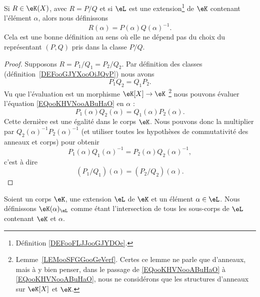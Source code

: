 \begin{lemmaDef}        \label{DEFooZHBZooKlNfGZ}
    Si \( R\in \eK(X)\), avec \( R=P/Q\) et si \( \eL\) est une extension\footnote{Définition \ref{DEFooFLJJooGJYDOe}.} de \( \eK\) contenant l'élément \( \alpha\), alors nous définissons
    \begin{equation}
        R(\alpha)=P(\alpha)Q(\alpha)^{-1}.
    \end{equation}
    Cela est une bonne définition au sens où elle ne dépend pas du choix du représentant \( (P,Q)\) pris dans la classe \( P/Q\).
\end{lemmaDef}

\begin{proof}
    Supposons \( R=P_1/Q_1=P_2/Q_2\). Par définition des classes (définition~\ref{DEFooGJYXooOiJQvP}) nous avons
    \begin{equation}        \label{EQooKHVNooABuHaO}
        P_1Q_2=Q_1P_2.
    \end{equation}
    Vu que l'évaluation est un morphisme \( \eK[X]\to\eK\) \footnote{Lemme~\ref{LEMooSFGGooGeVerf}. Certes ce lemme ne parle que d'anneaux, mais à y bien penser, dans le passage de \eqref{EQooKHVNooABuHaO} à \eqref{EQooKHVNooABuHaO}, nous ne considérons que les structures d'anneaux sur \( \eK[X]\) et \( \eK\).} nous pouvons évaluer l'équation \eqref{EQooKHVNooABuHaO} en \( \alpha\) :
    \begin{equation}        \label{EQooJAIGooRADgiD}
        P_1(\alpha)Q_2(\alpha)=Q_1(\alpha)P_2(\alpha).
    \end{equation}
    Cette dernière est une égalité dans le corps \( \eK\). Nous pouvons donc la multiplier par \( Q_2(\alpha)^{-1}P_2(\alpha)^{-1}\) (et utiliser toutes les hypothèses de commutativité des anneaux et corps) pour obtenir
    \begin{equation}
        P_1(\alpha)Q_1(\alpha)^{-1}=P_2(\alpha)Q_2(\alpha)^{-1},
    \end{equation}
    c'est à dire
    \begin{equation}
        (P_1/Q_1)(\alpha)=(P_2/Q_2)(\alpha).
    \end{equation}
\end{proof}

\begin{definition}  \label{DEFooVSKGooMyeGel}
    Soient un corps \( \eK\), une extension \( \eL\) de \( \eK\) et un élément \( \alpha\in\eL\). Nous définissons \( \eK(\alpha)_{\eL} \) comme étant l'intersection de tous les sous-corps de \( \eL\) contenant \( \eK\) et \( \alpha\).
\end{definition}

